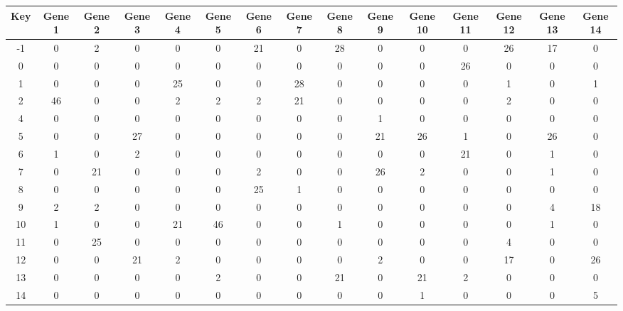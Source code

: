 \begin{tabular}{|c|c|c|c|c|c|c|c|c|c|c|c|c|c|c|}
\hline
Key & Gene 1 & Gene 2 & Gene 3 & Gene 4 & Gene 5 & Gene 6 & Gene 7 & Gene 8 & Gene 9 & Gene 10 & Gene 11 & Gene 12 & Gene 13 & Gene 14 \\
\hline
-1 & 0 & 2 & 0 & 0 & 0 & 21 & 0 & 28 & 0 & 0 & 0 & 26 & 17 & 0 \\
0 & 0 & 0 & 0 & 0 & 0 & 0 & 0 & 0 & 0 & 0 & 26 & 0 & 0 & 0 \\
1 & 0 & 0 & 0 & 25 & 0 & 0 & 28 & 0 & 0 & 0 & 0 & 1 & 0 & 1 \\
2 & 46 & 0 & 0 & 2 & 2 & 2 & 21 & 0 & 0 & 0 & 0 & 2 & 0 & 0 \\
4 & 0 & 0 & 0 & 0 & 0 & 0 & 0 & 0 & 1 & 0 & 0 & 0 & 0 & 0 \\
5 & 0 & 0 & 27 & 0 & 0 & 0 & 0 & 0 & 21 & 26 & 1 & 0 & 26 & 0 \\
6 & 1 & 0 & 2 & 0 & 0 & 0 & 0 & 0 & 0 & 0 & 21 & 0 & 1 & 0 \\
7 & 0 & 21 & 0 & 0 & 0 & 2 & 0 & 0 & 26 & 2 & 0 & 0 & 1 & 0 \\
8 & 0 & 0 & 0 & 0 & 0 & 25 & 1 & 0 & 0 & 0 & 0 & 0 & 0 & 0 \\
9 & 2 & 2 & 0 & 0 & 0 & 0 & 0 & 0 & 0 & 0 & 0 & 0 & 4 & 18 \\
10 & 1 & 0 & 0 & 21 & 46 & 0 & 0 & 1 & 0 & 0 & 0 & 0 & 1 & 0 \\
11 & 0 & 25 & 0 & 0 & 0 & 0 & 0 & 0 & 0 & 0 & 0 & 4 & 0 & 0 \\
12 & 0 & 0 & 21 & 2 & 0 & 0 & 0 & 0 & 2 & 0 & 0 & 17 & 0 & 26 \\
13 & 0 & 0 & 0 & 0 & 2 & 0 & 0 & 21 & 0 & 21 & 2 & 0 & 0 & 0 \\
14 & 0 & 0 & 0 & 0 & 0 & 0 & 0 & 0 & 0 & 1 & 0 & 0 & 0 & 5 \\
\hline
\end{tabular}